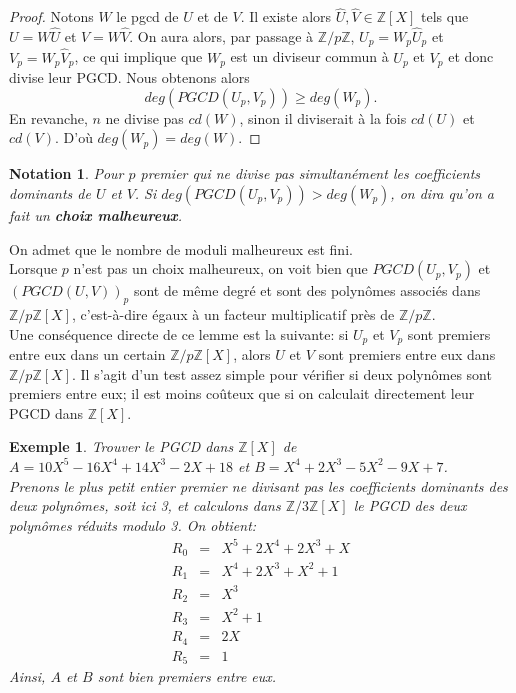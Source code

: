 \documentclass[12pt]{report}
\newtheorem*{ex}{Exemple}
\newtheorem*{nota}{Notation}
\begin{document}
\begin{proof}
Notons $W$ le pgcd de $U$ et de $V$. Il existe alors $\widehat{U},\widehat{V} \in \mathbb{Z}[X]$ tels que $U=W\widehat{U} $ et $V=W\widehat{V}$. On aura alors, par passage à $\mathbb{Z}/p\mathbb{Z}$, $U_p=W_p\widehat{U}_p $ et $V_p=W_p\widehat{V}_p$, ce qui implique que $W_p$ est un diviseur commun à $U_p$ et $V_p$ et donc divise leur PGCD. Nous obtenons alors
$$ deg (PGCD(U_p,V_p) ) \geq deg (W_p).       $$
En revanche, $n$ ne divise pas $cd(W)$, sinon il diviserait à la fois $cd(U)$ et $cd(V)$. D'où $deg(W_p)=deg(W)$.
\end{proof}



\begin{nota}
Pour $p$ premier qui ne divise pas simultanément les coefficients dominants de $U$ et $V$. Si $deg (PGCD(U_p,V_p) ) > deg (W_p)$, on dira qu'on a fait un \textbf{choix malheureux}. 
\end{nota}
On admet que le nombre de moduli malheureux est fini. \\

Lorsque $p$ n'est pas un choix malheureux, on voit bien que $PGCD(U_p,V_p)$ et $(PGCD(U,V))_p$ sont de même degré et sont des polynômes associés dans $\mathbb{Z}/p\mathbb{Z}[X]$, c'est-à-dire égaux à un facteur multiplicatif près de $\mathbb{Z}/p\mathbb{Z}$. \\

Une conséquence directe de ce lemme est la suivante: si $U_p$ et $V_p$ sont premiers entre eux dans un certain $\mathbb{Z}/p\mathbb{Z}[X]$, alors $U$ et $V$ sont premiers entre eux dans $\mathbb{Z}/p\mathbb{Z}[X]$. Il s'agit d'un test assez simple pour vérifier si deux polynômes sont premiers entre eux; il est moins coûteux que si on calculait 
directement leur PGCD dans $\mathbb{Z}[X]$.

\begin{ex}
Trouver le PGCD dans $\mathbb{Z}[X]$ de $A=10X^5-16X^4 +14 X^3 -2X +18$ et $B=X^4+2X^3-5X^2-9X+7$. \\
Prenons le plus petit entier premier ne divisant pas  les coefficients dominants des deux polynômes, soit ici 3, et calculons dans $\mathbb{Z}/3 \mathbb{Z}[X]$ le PGCD des deux polynômes réduits modulo 3. On obtient:
 \begin{eqnarray*}
 R_0 &=&   X^5 +2X^4+2X^3+X \\
 R_1 &=& X^4+2X^3+X^2+1 \\
 R_2 &=& X^3 \\
 R_3 &=& X^2+1 \\
 R_4 &=& 2X \\
 R_5 &=& 1
 \end{eqnarray*}
 Ainsi, $A$ et $B$ sont bien premiers entre eux.
\end{ex}
 
\end{document}
